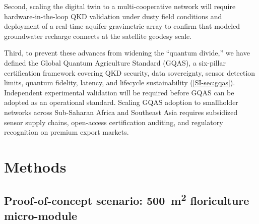 \documentclass[12pt]{iopart}
\begin{document}
Second, scaling the digital twin to a multi-cooperative network will require hardware-in-the-loop QKD validation under dusty field conditions and deployment of a real-time aquifer gravimetric array to confirm that modeled groundwater recharge connects at the satellite geodesy scale.

Third, to prevent these advances from widening the ``quantum divide,'' we have defined the Global Quantum Agriculture Standard (GQAS), a six-pillar certification framework covering QKD security, data sovereignty, sensor detection limits, quantum fidelity, latency, and lifecycle sustainability (\cref{SI-sec:gqas}). Independent experimental validation will be required before GQAS can be adopted as an operational standard. Scaling GQAS adoption to smallholder networks across Sub-Saharan Africa and Southeast Asia requires subsidized sensor supply chains, open-access certification auditing, and regulatory recognition on premium export markets.


\section{Methods}

\subsection{Proof-of-concept scenario: \qty{500}{\m\squared} floriculture micro-module}
\end{document}
